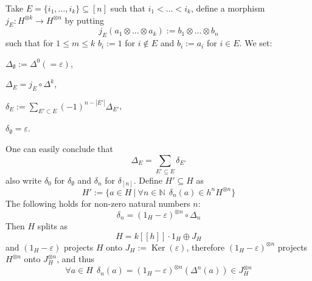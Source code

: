 \documentclass[8pt]{article}
\theoremstyle{definition}
\theoremstyle{definition}
\theoremstyle{definition}
\theoremstyle{definition}
\theoremstyle{definition}
\theoremstyle{definition}
\theoremstyle{definition}
\theoremstyle{definition}
\theoremstyle{definition}
\theoremstyle{definition}
\theoremstyle{definition}
\theoremstyle{definition}
\theoremstyle{definition}
\theoremstyle{definition}
\theoremstyle{question}
\begin{document}
  Take $E = \{ i_1, \ldots, i_k \} \subseteq [n]$ such that $i_1 < \ldots < i_k$, define a morphism
  $j_E : H^{\otimes k} \to H^{\otimes n}$ by putting
  \[
  j_E (a_1 \otimes \ldots \otimes a_k) := b_1 \otimes \ldots \otimes b_n
  \]
  such that for $1 \leq m \leq k$ $b_i := 1$ for $i \notin E$ and $b_i := a_i$ for $i \in E$.
  We set:
  \begin{center}
    $\Delta_{\emptyset} := \Delta^0 (= \varepsilon)$,

    $\Delta_E = j_E \circ \Delta^k$,

    $\delta_E := \sum \limits_{E' \subset E} (-1)^{n - |E'|} \Delta_{E'}$,

    $\delta_{\emptyset} = \varepsilon$.
  \end{center}
  One can easily conclude that 
  \[
  \Delta_E = \sum \limits_{E' \subseteq E} \delta_{E'} 
  \]
  also write $\delta_0$ for $\delta_{\emptyset}$ and $\delta_n$ for $\delta_{[n]}$. Define $H' \subseteq H$ as
  \[
  H' := \{ a \in H \: | \: \forall n \in \mathbb{N} \:\: \delta_n(a) \in h^n H^{\otimes n}\}
  \]
  The following holds for non-zero natural numbers $n$:
  \[
  \delta_n = (1_H - \varepsilon)^{\otimes n} \circ \Delta_n
  \]
  Then $H$ splits as
  \[
  H = k[[h]] \cdot 1_H \oplus J_H
  \]
  and $(1_H - \varepsilon)$ projects $H$ onto $J_H := \operatorname{Ker}(\varepsilon)$,
  therefore $(1_H - \varepsilon)^{\otimes n}$ projects $H^{\otimes n}$ onto $J^{\otimes n}_H$, and thus
  \[
  \forall a \in H \:\: \delta_n(a) = (1_H - \varepsilon)^{\otimes n}(\Delta^n(a)) \in J^{\otimes n}_H
  \]
\end{document}
